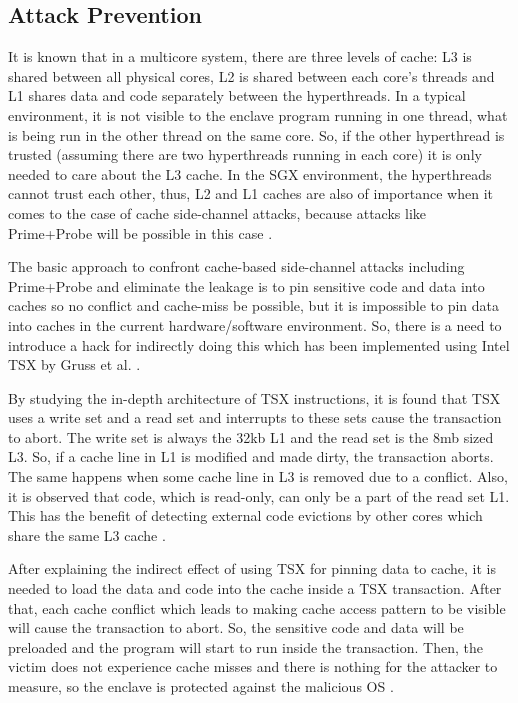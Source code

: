 \subsection{Attack Prevention}%
It is known that in a multicore system, there are three levels of cache: L3 is shared between all physical cores, L2 is shared between each core's threads and L1 shares data and code separately between the hyperthreads. In a typical environment, it is not visible to the enclave program running in one thread, what is being run in the other thread on the same core. So, if the other hyperthread is trusted (assuming there are two hyperthreads running in each core) it is only needed to care about the L3 cache. In the SGX environment, the hyperthreads cannot trust each other, thus, L2 and L1 caches are also of importance when it comes to the case of cache side-channel attacks, because attacks like Prime+Probe will be possible in this case \cite{cloak}.

The basic approach to confront cache-based side-channel attacks including Prime+Probe and eliminate the leakage is to pin sensitive code and data into caches so no conflict and cache-miss be possible, but it is impossible to pin data into caches in the current hardware/software environment. So, there is a need to introduce a hack for indirectly doing this which has been implemented using Intel TSX by Gruss et al. \cite{cloak}.

By studying the in-depth architecture of TSX instructions, it is found that TSX uses a write set and a read set and interrupts to these sets cause the transaction to abort. The write set is always the 32kb L1 and the read set is the 8mb sized L3. So, if a cache line in L1 is modified and made dirty, the transaction aborts. The same happens when some cache line in L3 is removed due to a conflict. Also, it is observed that code, which is read-only, can only be a part of the read set L1. This has the benefit of detecting external code evictions by other cores which share the same L3 cache \cite{cloak}.

After explaining the indirect effect of using TSX for pinning data to cache, it is needed to load the data and code into the cache inside a TSX transaction. After that, each cache conflict which leads to making cache access pattern to be visible will cause the transaction to abort. So, the sensitive code and data will be preloaded and the program will start to run inside the transaction. Then, the victim does not experience cache misses and there is nothing for the attacker to measure, so the enclave is protected against the malicious OS \cite{cloak}.

